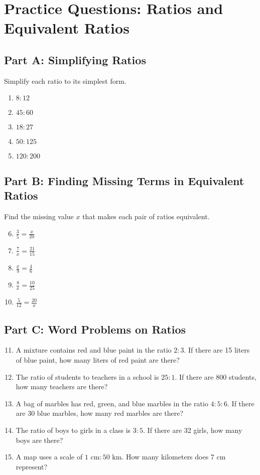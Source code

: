 \documentclass[12pt]{article}
\begin{document}
\section*{Practice Questions: Ratios and Equivalent Ratios}

\subsection*{Part A: Simplifying Ratios}
Simplify each ratio to its simplest form.
\begin{enumerate}
  \item \(8:12\)
  \item \(45:60\)
  \item \(18:27\)
  \item \(50:125\)
  \item \(120:200\)
\end{enumerate}

\subsection*{Part B: Finding Missing Terms in Equivalent Ratios}
Find the missing value \(x\) that makes each pair of ratios equivalent.
\begin{enumerate}
  \setcounter{enumi}{5}
  \item \(\frac{3}{5} = \frac{x}{20}\)
  \item \(\frac{7}{x} = \frac{21}{15}\)
  \item \(\frac{x}{9} = \frac{4}{6}\)
  \item \(\frac{8}{x} = \frac{10}{25}\)
  \item \(\frac{5}{12} = \frac{20}{x}\)
\end{enumerate}

\subsection*{Part C: Word Problems on Ratios}
\begin{enumerate}
  \setcounter{enumi}{10}
  \item A mixture contains red and blue paint in the ratio \(2:3\). If there are 15 liters of blue paint, how many liters of red paint are there?
  \item The ratio of students to teachers in a school is \(25:1\). If there are 800 students, how many teachers are there?
  \item A bag of marbles has red, green, and blue marbles in the ratio \(4:5:6\). If there are 30 blue marbles, how many red marbles are there?
  \item The ratio of boys to girls in a class is \(3:5\). If there are 32 girls, how many boys are there?
  \item A map uses a scale of \(1 \text{ cm} : 50 \text{ km}\). How many kilometers does 7 cm represent?
\end{enumerate}
\end{document}
